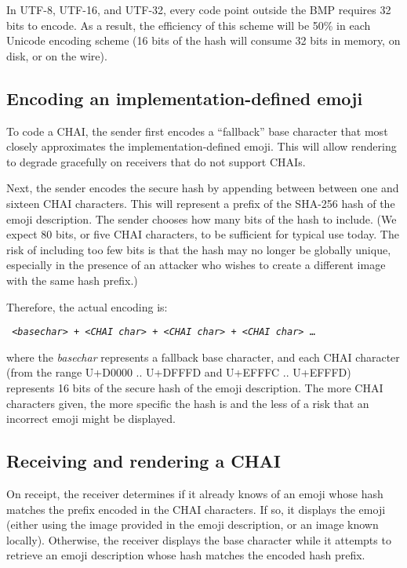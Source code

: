 \documentclass[12pt]{article}
\begin{document}
In UTF-8, UTF-16, and UTF-32, every code point outside the BMP
requires 32 bits to encode. As a result, the efficiency of
this scheme will be 50\% in each Unicode encoding scheme (16 bits of
the hash will consume 32 bits in memory, on disk, or on the wire).

\subsection{Encoding an implementation-defined emoji}

To code a CHAI, the sender first encodes a ``fallback'' base character
that most closely approximates the implementation-defined emoji. This
will allow rendering to degrade gracefully on receivers that do not
support CHAIs.

Next, the sender encodes the secure hash by appending between between
one and sixteen CHAI characters. This will represent a prefix of the
SHA-256 hash of the emoji description. The sender chooses how many
bits of the hash to include. (We expect 80 bits, or five CHAI
characters, to be sufficient for typical use today. The risk of
including too few bits is that the hash may no longer be globally unique,
especially in the presence of an attacker who wishes to create a different
image with the same hash prefix.)

Therefore, the actual encoding is:

\texttt { <\textit{basechar}> + <\textit{CHAI char}> + <\textit{CHAI char}> + <\textit{CHAI char}> \ldots }

where the \textit{basechar} represents a fallback base character, and
each CHAI character (from the range U+D0000 .. U+DFFFD and U+EFFFC
.. U+EFFFD) represents 16 bits of the secure hash of the emoji
description. The more CHAI characters given, the more specific the hash
is and the less of a risk that an incorrect emoji might be displayed.

\subsection{Receiving and rendering a CHAI}

On receipt, the receiver determines if it already knows of an emoji
whose hash matches the prefix encoded in the CHAI characters. If so,
it displays the emoji (either using the image provided in the emoji
description, or an image known locally). Otherwise, the receiver
displays the base character while it attempts to retrieve an emoji
description whose hash matches the encoded hash prefix.
\end{document}
